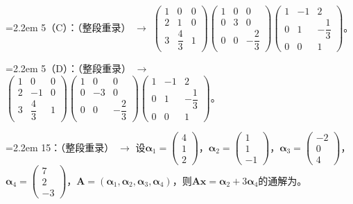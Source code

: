 \documentclass[11pt,a4paper]{ctexart}
\newcommand{\rc}[1]{\textcolor{errata-red}{#1}}
\newcommand{\gc}[1]{\textcolor{errata-green}{#1}}
\newcommand{\pair}[1]{\par\hangindent=2.2em\hangafter=1 #1\par\vspace{1pt}}
\newcommand{\ExamBlank}{\underline{\hspace{3em}}}
\begin{document}
\pair{5（C）：\rc{（整段重录）} $\longrightarrow$ \gc{$\begin{pmatrix}1&0&0\\2&1&0\\3&\dfrac43&1\end{pmatrix}\begin{pmatrix}1&0&0\\0&3&0\\0&0&-\dfrac23\end{pmatrix}\begin{pmatrix}1&-1&2\\0&1&-\dfrac13\\0&0&1\end{pmatrix}$。}}
\pair{5（D）：\rc{（整段重录）} $\longrightarrow$ \gc{$\begin{pmatrix}1&0&0\\2&-1&0\\3&\dfrac43&1\end{pmatrix}\begin{pmatrix}1&0&0\\0&-3&0\\0&0&-\dfrac23\end{pmatrix}\begin{pmatrix}1&-1&2\\0&1&-\dfrac13\\0&0&1\end{pmatrix}$。}}
\pair{15：\rc{（整段重录）} $\longrightarrow$ \gc{设$\boldsymbol{\alpha}_1=\begin{pmatrix}4\\1\\2\end{pmatrix}$，$\boldsymbol{\alpha}_2=\begin{pmatrix}1\\1\\-1\end{pmatrix}$，$\boldsymbol{\alpha}_3=\begin{pmatrix}-2\\0\\4\end{pmatrix}$，$\boldsymbol{\alpha}_4=\begin{pmatrix}7\\2\\-3\end{pmatrix}$，$\boldsymbol{A}=(\boldsymbol{\alpha}_1,\boldsymbol{\alpha}_2,\boldsymbol{\alpha}_3,\boldsymbol{\alpha}_4)$，则$\boldsymbol{A}\boldsymbol{x}=\boldsymbol{\alpha}_2+3\boldsymbol{\alpha}_4$的通解为\ExamBlank。}}
\end{document}
